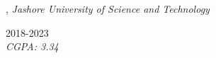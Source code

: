 ,
\textit{Jashore University of Science and Technology}\strut \hfill 2018-2023\\
\textit{CGPA: 3.34}

